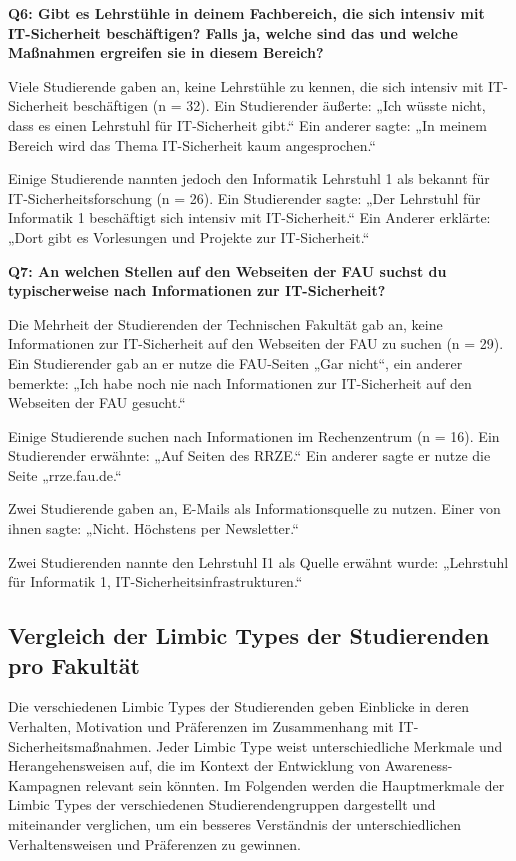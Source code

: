 \documentclass[german,report]{i1thesis}
\begin{document}
\textbf{Q6: Gibt es Lehrstühle in deinem Fachbereich, die sich intensiv mit IT-Sicherheit beschäftigen? Falls ja, welche sind das und welche Maßnahmen ergreifen sie in diesem Bereich?}

Viele Studierende gaben an, keine Lehrstühle zu kennen, die sich intensiv mit IT-Sicherheit beschäftigen (n = 32). Ein Studierender äußerte: „Ich wüsste nicht, dass es einen Lehrstuhl für IT-Sicherheit gibt.“ Ein anderer sagte: „In meinem Bereich wird das Thema IT-Sicherheit kaum angesprochen.“

Einige Studierende nannten jedoch den Informatik Lehrstuhl 1 als bekannt für IT-Sicherheitsforschung (n = 26). Ein Studierender sagte: „Der Lehrstuhl für Informatik 1 beschäftigt sich intensiv mit IT-Sicherheit.“ Ein Anderer erklärte: „Dort gibt es Vorlesungen und Projekte zur IT-Sicherheit.“

\textbf{Q7: An welchen Stellen auf den Webseiten der FAU suchst du typischerweise nach Informationen zur IT-Sicherheit?}

Die Mehrheit der Studierenden der Technischen Fakultät gab an, keine Informationen zur IT-Sicherheit auf den Webseiten der FAU zu suchen (n = 29). Ein Studierender gab an er nutze die FAU-Seiten „Gar nicht“,  ein anderer bemerkte: „Ich habe noch nie nach Informationen zur IT-Sicherheit auf den Webseiten der FAU gesucht.“

Einige Studierende suchen nach Informationen im Rechenzentrum (n = 16). Ein Studierender erwähnte: „Auf Seiten des RRZE.“ Ein anderer sagte er nutze die Seite „rrze.fau.de.“

Zwei Studierende gaben an, E-Mails als Informationsquelle zu nutzen. Einer von ihnen sagte: „Nicht. Höchstens per Newsletter.“

Zwei Studierenden nannte den Lehrstuhl I1 als Quelle erwähnt wurde: „Lehrstuhl für Informatik 1, IT-Sicherheitsinfrastrukturen.“

\subsection{Vergleich der Limbic Types der Studierenden pro Fakultät}

Die verschiedenen Limbic Types \cite{hausel2011wissenschaftliche} der Studierenden geben Einblicke in deren Verhalten, Motivation und Präferenzen im Zusammenhang mit IT-Sicherheitsmaßnahmen. Jeder Limbic Type weist unterschiedliche Merkmale und Herangehensweisen auf, die im Kontext der Entwicklung von Awareness-Kampagnen relevant sein könnten. Im Folgenden werden die Hauptmerkmale der Limbic Types der verschiedenen Studierendengruppen dargestellt und miteinander verglichen, um ein besseres Verständnis der unterschiedlichen Verhaltensweisen und Präferenzen zu gewinnen.
\end{document}
